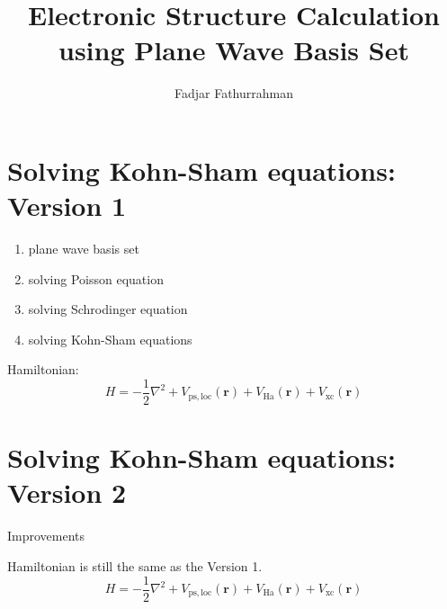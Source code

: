 \documentclass[a4paper,11pt]{extbook}
\begin{document}
\title{Electronic Structure Calculation using Plane Wave Basis Set}
\author{Fadjar Fathurrahman}
\date{}
\maketitle

\tableofcontents




\chapter{Solving Kohn-Sham equations: Version 1}

\begin{enumerate}
\item plane wave basis set
\item solving Poisson equation
\item solving Schrodinger equation
\item solving Kohn-Sham equations
\end{enumerate}

Hamiltonian:
\begin{equation}
H = -\frac{1}{2}\nabla^2 + V_{\mathrm{ps,loc}}(\mathbf{r}) +
V_{\mathrm{Ha}}(\mathbf{r}) + V_{\mathrm{xc}}(\mathbf{r})
\end{equation}











\chapter{Solving Kohn-Sham equations: Version 2}

Improvements

Hamiltonian is still the same as the Version 1.
\begin{equation}
H = -\frac{1}{2}\nabla^2 + V_{\mathrm{ps,loc}}(\mathbf{r}) +
V_{\mathrm{Ha}}(\mathbf{r}) + V_{\mathrm{xc}}(\mathbf{r})
\end{equation}







\end{document}
